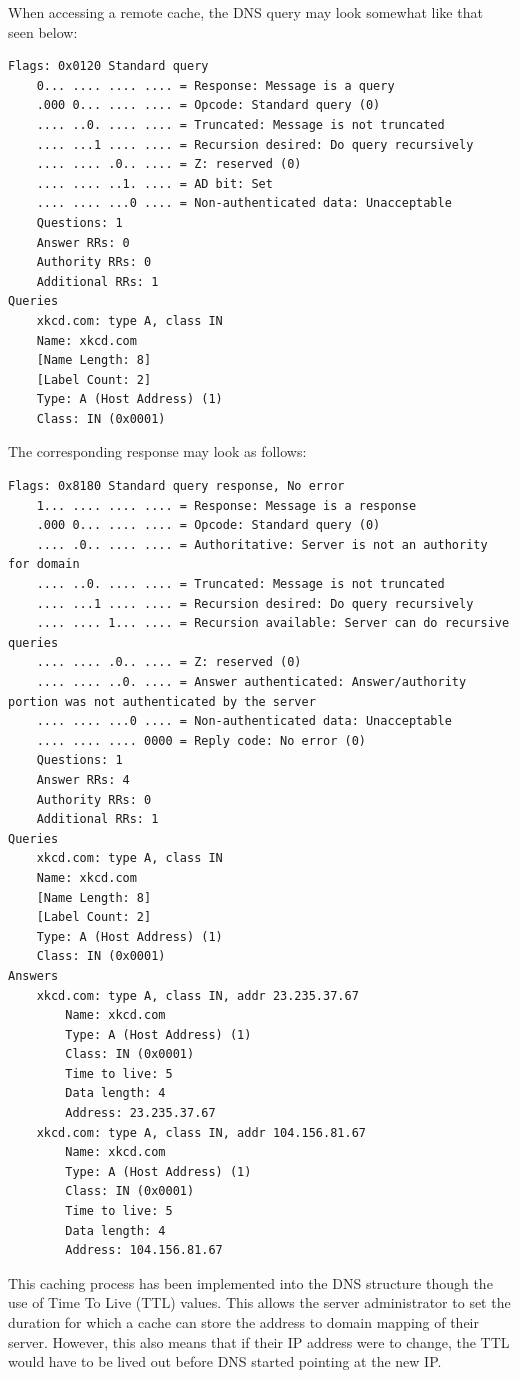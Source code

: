 \documentclass[a4paper,11pt]{report}
\begin{document}
			When accessing a remote cache, the DNS query may look somewhat like that seen below:
			\begin{verbatim}
Flags: 0x0120 Standard query
	0... .... .... .... = Response: Message is a query
	.000 0... .... .... = Opcode: Standard query (0)
	.... ..0. .... .... = Truncated: Message is not truncated
	.... ...1 .... .... = Recursion desired: Do query recursively
	.... .... .0.. .... = Z: reserved (0)
	.... .... ..1. .... = AD bit: Set
	.... .... ...0 .... = Non-authenticated data: Unacceptable
	Questions: 1
	Answer RRs: 0
	Authority RRs: 0
	Additional RRs: 1
Queries	
	xkcd.com: type A, class IN
	Name: xkcd.com
	[Name Length: 8]
	[Label Count: 2]
	Type: A (Host Address) (1)
	Class: IN (0x0001)
			\end{verbatim}
			The corresponding response may look as follows:
			\begin{verbatim}
Flags: 0x8180 Standard query response, No error
	1... .... .... .... = Response: Message is a response
	.000 0... .... .... = Opcode: Standard query (0)
	.... .0.. .... .... = Authoritative: Server is not an authority for domain
	.... ..0. .... .... = Truncated: Message is not truncated
	.... ...1 .... .... = Recursion desired: Do query recursively
	.... .... 1... .... = Recursion available: Server can do recursive queries
	.... .... .0.. .... = Z: reserved (0)
	.... .... ..0. .... = Answer authenticated: Answer/authority portion was not authenticated by the server
	.... .... ...0 .... = Non-authenticated data: Unacceptable
	.... .... .... 0000 = Reply code: No error (0)	
	Questions: 1
	Answer RRs: 4
	Authority RRs: 0
	Additional RRs: 1
Queries
	xkcd.com: type A, class IN
	Name: xkcd.com
	[Name Length: 8]
	[Label Count: 2]
	Type: A (Host Address) (1)
	Class: IN (0x0001)
Answers
	xkcd.com: type A, class IN, addr 23.235.37.67
		Name: xkcd.com
		Type: A (Host Address) (1)
		Class: IN (0x0001)
		Time to live: 5
		Data length: 4
		Address: 23.235.37.67
	xkcd.com: type A, class IN, addr 104.156.81.67
		Name: xkcd.com
		Type: A (Host Address) (1)
		Class: IN (0x0001)	
		Time to live: 5
		Data length: 4
		Address: 104.156.81.67
			\end{verbatim}
			
			This caching process has been implemented into the DNS structure though the use of Time To Live (TTL) values. 
			This allows the server administrator to set the duration for which a cache can store the address to domain mapping of their server. 
			However, this also means that if their IP address were to change, the TTL would have to be lived out before DNS started pointing at the new IP. 
\end{document}
